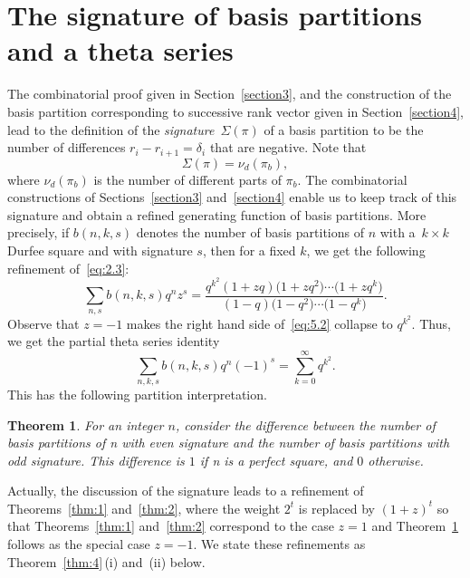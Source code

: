 \documentclass[pdftex]{sigma}
\numberwithin{equation}{section}
\newtheorem{Theorem}{Theorem}[section]
\theoremstyle{definition}
\begin{document}
\section{The signature of basis partitions and a theta series}\label{section5}

The combinatorial proof given in Section~\ref{section3}, and the construction of
the basis partition corresponding to successive rank vector given in
Section~\ref{section4}, lead to the definition of the {\it signature}~$\Sigma(\pi)$
of a basis partition to be the number of differences $r_i-r_{i+1}=\delta_i$
that are negative. Note that
\begin{equation*}
\Sigma (\pi)=\nu_d(\pi_b),%
\end{equation*}
where $\nu_d(\pi_b)$ is the number of different parts of $\pi_b$. The
combinatorial constructions of Sections~\ref{section3} and~\ref{section4} enable us to keep track
of this signature and obtain a refined generating function of basis
partitions. More precisely, if $b(n,k,s)$ denotes the number of basis
partitions of $n$ with a~${k\times k}$ Durfee square and with signature
$s$, then for a fixed $k$, we get the following refinement of~\eqref{eq:2.3}:
\begin{equation}
\sum_{n,s}b(n,k,s)q^nz^s=\frac{q^{k^2}(1+zq)\bigl(1+zq^2\bigr)\cdots \bigl(1+zq^k\bigr)}
{(1-q)\bigl(1-q^2\bigr)\cdots \bigl(1-q^k\bigr)}.\label{eq:5.2}
\end{equation}
Observe that $z=-1$ makes the right hand side of~\eqref{eq:5.2} collapse to
$q^{k^2}$. Thus, we get the partial theta series identity
\begin{equation*}
\sum_{n,k,s}b(n,k,s)q^n(-1)^s=\sum^{\infty}_{k=0}q^{k^2}.%
\end{equation*}
This has the following partition interpretation.

\begin{Theorem}\label{thm:3}
For an integer $n$, consider the difference between
the number of basis partitions of n with even signature and the number of
basis partitions with odd signature. This difference is $1$ if n is
a perfect square, and $0$ otherwise.
\end{Theorem}

Actually, the discussion of the signature leads to a refinement of
Theorems~\ref{thm:1} and~\ref{thm:2}, where the weight $2^t$ is replaced by $(1+z)^t$ so
that Theorems~\ref{thm:1} and~\ref{thm:2} correspond to the case $z=1$ and Theorem~\ref{thm:3}
follows as the special case $z=-1$. We state these refinements as
Theorem~\ref{thm:4}\,(i) and~(ii) below.
\end{document}
